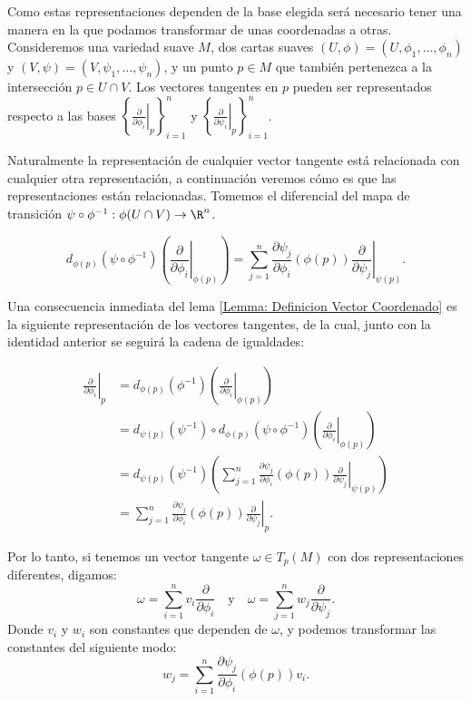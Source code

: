 Como estas representaciones dependen de la base elegida será necesario tener una manera en la que podamos transformar de unas coordenadas a otras. Consideremos una variedad suave $M$, dos cartas suaves $(U,\phi)=(U,\phi_1,\dots,\phi_n)$ y $(V,\psi)=(V,\psi_1,\dots,\psi_n)$, y un punto $p \in M$ que también pertenezca a la intersección $p \in U \cap V$. Los vectores tangentes en $p$ pueden ser representados respecto a las bases $\left\{\left. \frac{\partial}{\partial \phi_i} \right|_{p}\right\}_{i=1}^{n}$ y $\left\{\left. \frac{\partial}{\partial \psi_i} \right|_{p}\right\}_{i=1}^{n}$.

Naturalmente la representación de cualquier vector tangente está relacionada con cualquier otra representación, a continuación veremos cómo es que las representaciones están relacionadas. Tomemos el diferencial del mapa de transición $\psi \circ \phi^{-1}: \phi(U \cap V) \to \R^n$.

\[
	d_{\phi(p)}(\psi \circ \phi^{-1}) \left( \left. \frac{\partial}{\partial \phi_{i}} \right|_{\phi(p)} \right) = \sum_{j=1}^{n}\frac{\partial \psi_j}{\partial \phi_i} (\phi(p)) \left. \frac{\partial}{\partial \psi_{j}} \right|_{\psi(p)}.
\]

Una consecuencia inmediata del lema \ref{Lemma: Definicion Vector Coordenado} es la siguiente representación de los vectores tangentes, de la cual, junto con la identidad anterior se seguirá la cadena de igualdades:

\begin{align*}
	\left. \frac{\partial}{\partial \phi_i}\right|_{p}
	 & =
	d_{\phi(p)} \left(\phi^{-1}\right)
	\left(\left.
	\frac{\partial}{\partial \phi_i}
	\right|_{\phi(p)}\right)                                            \\
	 & =
	d_{\psi(p)}(\psi^{-1}) \circ d_{\phi(p)}\left(\psi \circ \phi^{-1}\right)
	\left( \left.
	\frac{\partial}{\partial \phi_i}
	\right|_{\phi(p)}\right)                                            \\
	 & =
	d_{\psi(p)}(\psi^{-1}) \left(
	\sum_{j=1}^{n}\frac{\partial \psi_j}{\partial \phi_i}(\phi(p))
	\left.
	\frac{\partial}{\partial \psi_j}
	\right|_{\psi(p)} \right)                                           \\
	 & = \sum_{j=1}^{n}\frac{\partial \psi_j}{\partial \phi_i}(\phi(p))
	\left.
	\frac{\partial}{\partial \psi_j}
	\right|_{p}.
\end{align*}

Por lo tanto, si tenemos un vector tangente $\omega \in T_p(M)$ con dos representaciones diferentes, digamos:
\[
	\omega = \sum_{i=1}^{n} v_i \frac{\partial}{\partial \phi_i}
	\quad \text{y} \quad
	\omega = \sum_{j=1}^{n} w_j \frac{\partial}{\partial \psi_j}.
\]
Donde $v_i$ y $w_i$ son constantes que dependen de $\omega$, y podemos transformar las constantes del siguiente modo:
\[
	w_j = \sum_{i=1}^{n} \frac{\partial \psi_j}{\partial \phi_i} (\phi(p)) v_i.
\]

